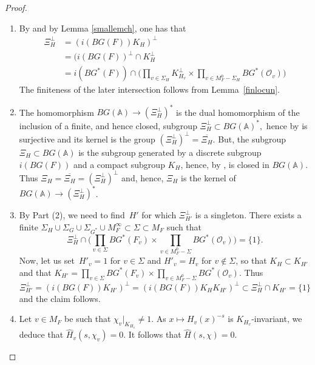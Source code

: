 \documentclass[a4paper,english,12pt]{amsart}
\newcommand{\GG}{ G}
\newcommand{\Ov}{\mathcal O _v}
\newcommand{\vMF}{v\in M_F}
\newcommand{\AAA}{\mathbb A}
\newcommand{\wH}{\widehat H}
\def\no{n\textsuperscript{0}\,}
\numberwithin{equation}{subsection}
\begin{document}
\begin{proof}
\begin{enumerate}
\item %
By \cite[Chapter 2, \S 1, \no 7, Corollary 2 of Theorem 4]{TSpectrale} and by Lemma \ref{smallemch}, one has that
\begin{align*}
\Xi_H^\perp&=(i(BG(F))K_H)^\perp\\&=(i(BG(F))^{\perp}\cap K_H^{\perp}\\&=i(BG^*(F))\cap\bigg(\prod_{v\in\Sigma_H}K_{H_v}^{\perp}\times\prod_{v\in M_F^{0}-\Sigma_H}B\GG^*(\Ov)\bigg)
\end{align*}
The finiteness of the later intersection follows from Lemma~\ref{finlocun}.
\item The homomorphism $BG(\AAA)\to (\Xi_H^\perp)^*$ is the dual homomorphism \cite[Chapter II, \S 1, \no 7, Page 124]{TSpectrale} of the inclusion of a finite, and hence closed, subgroup $\Xi_H^\perp\subset BG(\AAA)^*,$ hence by \cite[Chapter II, \S 1, \no 7, Theorem 4]{TSpectrale} is surjective and its kernel is the group $(\Xi_H^\perp)^{\perp}=\overline{\Xi_H}$. But, the subgroup $\Xi_H\subset BG(\AAA)$ is the subgroup generated by a discrete subgroup $i(BG(F))$ and a compact subgroup $K_H$, hence, by \cite[Chapter III, \S 4, \no 1, Corollary 1 of Proposition 1]{TopologieGj}, is closed in $BG(\AAA)$. Thus $\Xi_H=\overline{\Xi_H}=(\Xi_H^\perp)^\perp$ and, hence, $\Xi_H$ is the kernel of $BG(\AAA)\to (\Xi_H^\perp)^*$.
\item By Part (2), we need to find~$H'$ for which $\Xi_{H'}^{\perp}$ is a singleton. There exists a finite $\Sigma_H\cup\Sigma_G\cup\Sigma_{G^*}\cup M_F^{\infty}\subset \Sigma\subset M_F$ such that $$\Xi_H^{\perp}\cap \big(\prod_{v\in\Sigma}BG^*(F_v)\times\prod_{v\in M_F^0-\Sigma}BG^*(\Ov)\big)=\{1\}.$$ Now, let us set~$H'_v=1$ for $v\in\Sigma$ and $H'_v=H_v$ for $v\not\in\Sigma$, so that $K_{H}\subset K_{H'}$ and that $K_{H'}=\prod_{v\in\Sigma}BG^*(F_v)\times\prod_{v\in M_F^0-\Sigma}BG^*(\Ov).$ Thus $$\Xi_{H'}^{\perp}=(i(BG(F))K_{H'})^{\perp}=(i(BG(F))K_HK_{H'})^{\perp}\subset\Xi_H^{\perp}\cap K_{H'}=\{1\}$$and the claim follows. 
\item Let $\vMF$ be such that $\chi_v|_{K_{H_v}}\neq 1$. As $x\mapsto H_v(x)^{-s}$ is $K_{H_v}$-invariant, we deduce that $\wH_v(s,\chi_v)=0$. It follows that $\wH(s,\chi)=0$.
\end{enumerate}
\end{proof}
\end{document}
